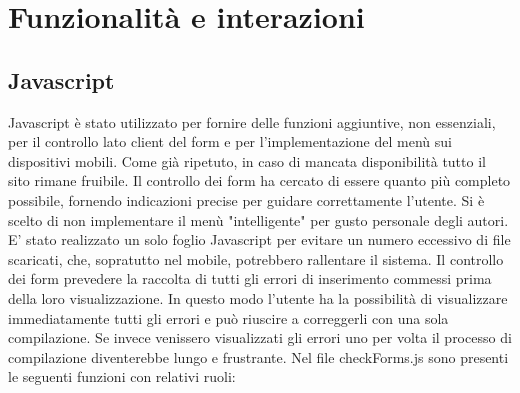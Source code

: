 \newpage
\section{Funzionalità e interazioni}
\subsection{Javascript}
Javascript è stato utilizzato per fornire delle funzioni aggiuntive, non essenziali, per il controllo lato client del form e per l'implementazione del menù sui dispositivi mobili. Come già ripetuto, in caso di mancata disponibilità tutto il sito rimane fruibile. 
Il controllo dei form ha cercato di essere quanto più completo possibile, fornendo indicazioni precise per guidare correttamente l'utente.
Si è scelto di non implementare il menù "intelligente" per gusto personale degli autori. 
E' stato realizzato un solo foglio Javascript per evitare un numero eccessivo di file scaricati, che, sopratutto nel mobile, potrebbero rallentare il sistema. Il controllo dei form prevedere la raccolta di tutti gli errori di inserimento commessi prima della loro visualizzazione. In questo modo l'utente ha la possibilità di visualizzare immediatamente tutti gli errori e può riuscire a correggerli con una sola compilazione. Se invece venissero visualizzati gli errori uno per volta il processo di compilazione diventerebbe lungo e frustrante.
Nel file checkForms.js sono presenti le seguenti funzioni con relativi ruoli:
